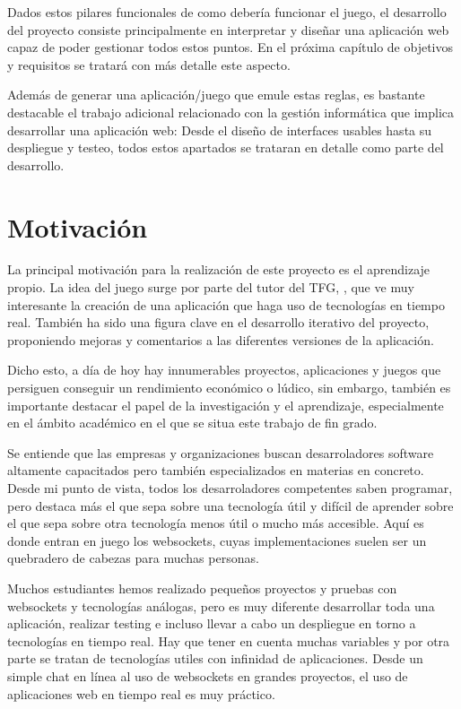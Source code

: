 Dados estos pilares funcionales de como debería funcionar el juego, el desarrollo del proyecto consiste principalmente en
interpretar y diseñar una aplicación web capaz de poder gestionar todos estos puntos. En el próxima capítulo de objetivos y requisitos se tratará
con más detalle este aspecto.

Además de generar una aplicación/juego que emule estas reglas, es bastante destacable el trabajo adicional relacionado con la gestión informática que
implica desarrollar una aplicación web: Desde el diseño de interfaces usables hasta su despliegue y testeo, todos estos apartados se trataran en detalle
como parte del desarrollo.

\section{Motivación}

La principal motivación para la realización de este proyecto es el aprendizaje propio. La idea del juego
surge por parte del tutor del TFG, \nombretutor, que ve muy interesante la creación de una aplicación que haga uso de tecnologías en
tiempo real. También ha sido una figura clave en el desarrollo iterativo del proyecto, proponiendo mejoras y comentarios
a las diferentes versiones de la aplicación.

Dicho esto, a día de hoy hay innumerables proyectos, aplicaciones y juegos que persiguen conseguir un rendimiento económico o lúdico, sin embargo, también es importante destacar el papel
de la investigación y el aprendizaje, especialmente en el ámbito académico en el que se situa este trabajo de fin grado.

Se entiende que las empresas y organizaciones buscan desarroladores software altamente capacitados pero también especializados en materias en concreto. Desde mi punto de vista,
todos los desarroladores competentes saben programar, pero destaca más el que sepa sobre una tecnología útil y difícil de aprender sobre el que sepa
sobre otra tecnología menos útil o mucho más accesible. Aquí es donde entran en juego los websockets, cuyas implementaciones suelen ser un quebradero
de cabezas para muchas personas.

Muchos estudiantes hemos realizado pequeños proyectos y pruebas con websockets y tecnologías análogas, pero es muy diferente desarrollar toda una aplicación, realizar testing e
incluso llevar a cabo un despliegue en torno a tecnologías en tiempo real. Hay que tener en cuenta muchas variables y por otra parte se tratan de tecnologías utiles
con infinidad de aplicaciones. Desde un simple chat en línea al uso de websockets en grandes proyectos, el uso de aplicaciones web en tiempo real es muy práctico.

